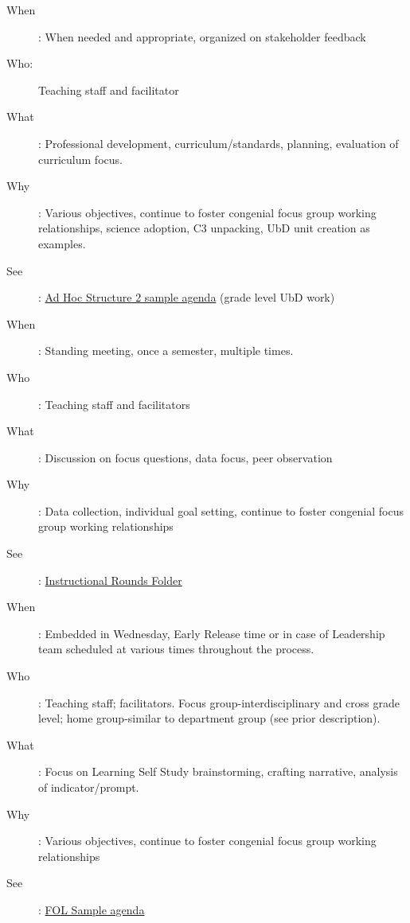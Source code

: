 \begin{findings}

\begin{description}
\item [When]: When needed and appropriate, organized on stakeholder feedback 
\item [Who:] Teaching staff and facilitator 
\item [What]: Professional development, curriculum/standards, planning, evaluation of curriculum focus.
\item [Why]: Various objectives, continue to foster congenial focus group working relationships, science adoption, C3 unpacking,  UbD unit creation as examples. 
\item [See]: \href{https://docs.google.com/a/cmis.ac.th/document/d/1PWUPZmm2vR4IJ7SX3x5nhWWZvAfZ6Krz9QMHi78HCNA/edit?usp=sharing}{Ad Hoc Structure 2 sample agenda} (grade level UbD work)
\end{description}



\begin{description}
\item [When]: Standing meeting, once a semester, multiple times. 
\item [Who]: Teaching staff and facilitators 
\item [What]: Discussion on focus questions, data focus, peer observation
\item [Why]: Data collection, individual goal setting, continue to foster congenial focus group working relationships
\item [See]: \href{https://drive.google.com/drive/folders/0ByVFfrm0zfolQ3FRNWNSVmpCUUk?usp=sharing}{Instructional Rounds Folder}
\end{description}



\begin{description}
\item [When]: Embedded in Wednesday, Early Release time or in case of Leadership team scheduled at various times throughout the process.
\item [Who]: Teaching staff; facilitators.  Focus group-interdisciplinary and cross grade level; home group-similar to department group (see prior description).
\item [What]: Focus on Learning Self Study brainstorming, crafting narrative, analysis of indicator/prompt.
\item [Why]: Various objectives, continue to foster congenial focus group working relationships
\item [See]: \href{https://docs.google.com/a/cmis.ac.th/document/d/16YqTcAhgTRg8LaIyVsV3moEB8PXdObg2IW2e_7fB3Fk/edit?usp=sharing}{FOL Sample agenda}
\end{description}



\end{findings}
